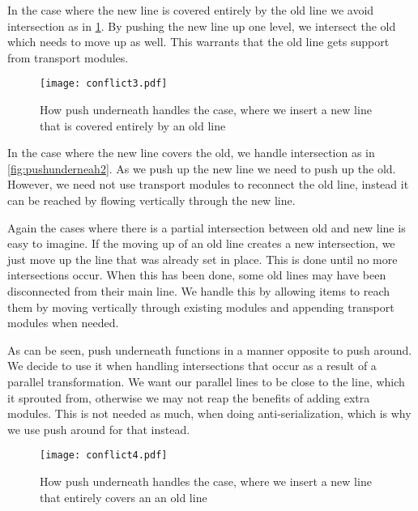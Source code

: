In the case where the new line is covered entirely by the old line we avoid intersection as in \cref{fig:pushunderneath1}. By pushing the new line up one level, we intersect the old which needs to move up as well. This warrants that the old line gets support from transport modules.

\begin{figure}[H]
\centering
\texttt{[image: conflict3.pdf]}
\caption{How push underneath handles the case, where we insert a new line that is covered entirely by an old line}
\label{fig:pushunderneath1}
\end{figure}

In the case where the new line covers the old, we handle intersection as in \cref{fig:pushunderneah2}. As we push up the new line we need to push up the old. However, we need not use transport modules to reconnect the old line, instead it can be reached by flowing vertically through the new line.

Again the cases where there is a partial intersection between old and new line is easy to imagine. If the moving up of an old line creates a new intersection, we just move up the line that was already set in place. This is done until no more intersections occur. When this has been done, some old lines may have been disconnected from their main line. We handle this by allowing items to reach them by moving vertically through existing modules and appending transport modules when needed.  

As can be seen, push underneath functions in a manner opposite to push around. We decide to use it when handling intersections that occur as a result of a parallel transformation. We want our parallel lines to be close to the line, which it sprouted from, otherwise we may not reap the benefits of adding extra modules. This is not needed as much, when doing anti-serialization, which is why we use push around for that instead.

  

\begin{figure}[H]
\centering
\texttt{[image: conflict4.pdf]}
\caption{How push underneath handles the case, where we insert a new line that  entirely covers an an old line}
\label{fig:pushunderneath2}
\end{figure}

